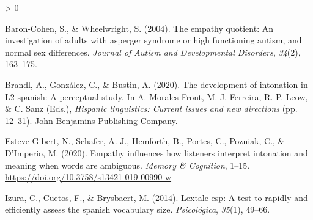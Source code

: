 \documentclass[
  11pt,
]{article}
\newlength{\cslhangindent}
\newenvironment{CSLReferences}[2] %
 {%
  \setlength{\parindent}{0pt}
  \ifodd #1 \everypar{\setlength{\hangindent}{\cslhangindent}}\ignorespaces\fi
  \ifnum #2 > 0
  \setlength{\parskip}{#2\baselineskip}
  \fi
 }%
 {}
\begin{document}
\hypertarget{refs}{}
\begin{CSLReferences}{1}{0}
\leavevmode\hypertarget{ref-baron2004empathy}{}%
Baron-Cohen, S., \& Wheelwright, S. (2004). The empathy quotient: An
investigation of adults with asperger syndrome or high functioning
autism, and normal sex differences. \emph{Journal of Autism and
Developmental Disorders}, \emph{34}(2), 163--175.

\leavevmode\hypertarget{ref-bustin_2020}{}%
Brandl, A., González, C., \& Bustin, A. (2020). The development of
intonation in L2 spanish: A perceptual study. In A. Morales-Front, M. J.
Ferreira, R. P. Leow, \& C. Sanz (Eds.), \emph{Hispanic linguistics:
Current issues and new directions} (pp. 12--31). John Benjamins
Publishing Company.

\leavevmode\hypertarget{ref-esteve2020empathy}{}%
Esteve-Gibert, N., Schafer, A. J., Hemforth, B., Portes, C., Pozniak,
C., \& D'Imperio, M. (2020). Empathy influences how listeners interpret
intonation and meaning when words are ambiguous. \emph{Memory \&
Cognition}, 1--15. \url{https://doi.org/10.3758/s13421-019-00990-w}

\leavevmode\hypertarget{ref-izura2014lextale}{}%
Izura, C., Cuetos, F., \& Brysbaert, M. (2014). Lextale-esp: A test to
rapidly and efficiently assess the spanish vocabulary size.
\emph{Psicol{ó}gica}, \emph{35}(1), 49--66.

\end{CSLReferences}

\endgroup
\end{document}

